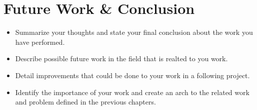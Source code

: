 \section{Future Work \& Conclusion}

\begin{itemize}
	\item Summarize your thoughts and state your final conclusion about the work you have performed.
	\item Describe possible future work in the field that is realted to you work.
	\item Detail improvements that could be done to your work in a following project.
	\item Identify the importance of your work and create an arch to the related work and problem defined in the previous chapters.
\end{itemize}